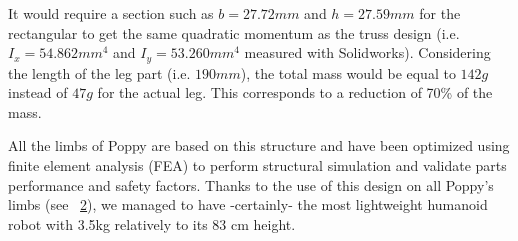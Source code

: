 \begin{figure}[!h]
\centering
    \hfil
    \caption{}
    \label{fig:leg_section}
\end{figure}

It would require a section such as $b=27.72 mm$ and $h=27.59 mm$ for the rectangular to get the same quadratic momentum as the truss design (i.e. $I_x = 54.862 mm^4$ and $I_y = 53.260 mm^4$ measured with Solidworks).
Considering the length of the leg part (i.e. $190 mm$), the total mass would be equal to $142 g$ instead of $47 g$ for the actual leg. This corresponds to a reduction of 70\% of the mass.

\begin{figure}[!h]
\centering


    \caption{}
    \label{fig:poppy_truss_structure}
\end{figure}

All the limbs of Poppy are based on this structure and have been optimized using finite element analysis (FEA) to perform structural simulation and validate parts performance and safety factors.
Thanks to the use of this design on all Poppy's limbs (see \figurename~\ref{fig:poppy_truss_structure}), we managed to have -certainly- the most lightweight humanoid robot with 3.5kg relatively to its 83 cm height.









% 










